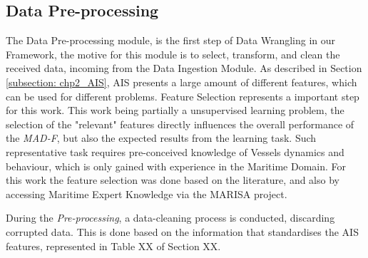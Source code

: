





\subsection{Data Pre-processing}
\label{subsection: 3 Pre-processing}
The Data Pre-processing module, is the first step of Data Wrangling in our Framework, the motive for this module is to select, transform, and clean the received data, incoming from the Data Ingestion Module. 
As described in Section \ref{subsection: chp2_AIS}, AIS presents a large amount of different features, which can be used for different problems. Feature Selection represents a important step for this work. This work being partially a unsupervised learning problem, the selection of the "relevant" features directly influences the overall performance of the \emph{MAD-F}, but also the expected results from the learning task. Such representative task requires pre-conceived knowledge of Vessels dynamics and behaviour, which is only gained with experience in the Maritime Domain. For this work the feature selection was done based on the literature, and also by accessing Maritime Expert Knowledge via the MARISA project.

During the \emph{Pre-processing}, a data-cleaning process is conducted, discarding corrupted data. This is done based on the information that standardises the AIS features, represented in Table XX of Section XX.

